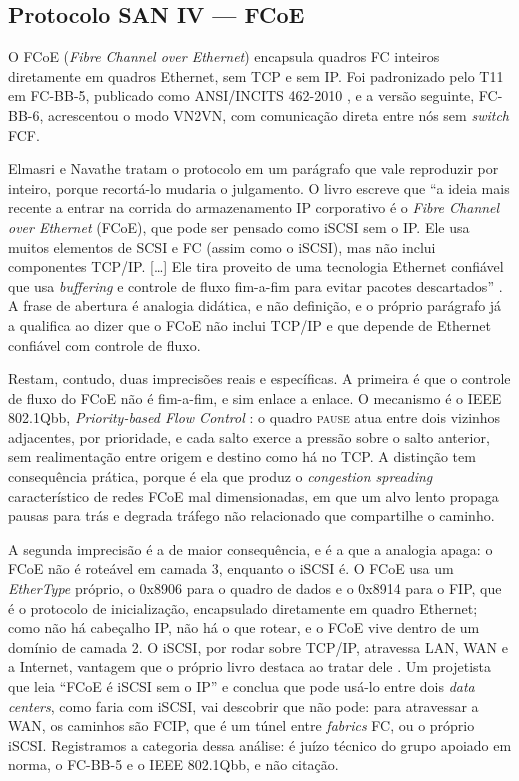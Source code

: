 \documentclass[11pt,a4paper]{article}
\begin{document}
\subsection{Protocolo SAN IV --- FCoE}
\label{sec:fcoe}

O FCoE (\textit{Fibre Channel over Ethernet}) encapsula quadros FC inteiros diretamente em quadros
Ethernet, sem TCP e sem IP. Foi padronizado pelo T11 em FC-BB-5, publicado como ANSI/INCITS 462-2010
\cite{fcbb5}, e a versão seguinte, FC-BB-6, acrescentou o modo VN2VN, com comunicação direta entre
nós sem \textit{switch} FCF.

Elmasri e Navathe tratam o protocolo em um parágrafo que vale reproduzir por inteiro, porque
recortá-lo mudaria o julgamento. O livro escreve que ``a ideia mais recente a entrar na corrida do
armazenamento IP corporativo é o \textit{Fibre Channel over Ethernet} (FCoE), que pode ser pensado
como iSCSI sem o IP. Ele usa muitos elementos de SCSI e FC (assim como o iSCSI), mas não inclui
componentes TCP/IP. [\ldots] Ele tira proveito de uma tecnologia Ethernet confiável que usa
\textit{buffering} e controle de fluxo fim-a-fim para evitar pacotes descartados''
\cite{elmasri2018}. A frase de abertura é analogia didática, e não definição, e o próprio parágrafo
já a qualifica ao dizer que o FCoE não inclui TCP/IP e que depende de Ethernet confiável com controle
de fluxo.

Restam, contudo, duas imprecisões reais e específicas. A primeira é que o controle de fluxo do FCoE
não é fim-a-fim, e sim enlace a enlace. O mecanismo é o IEEE 802.1Qbb, \textit{Priority-based Flow
Control} \cite{ieee8021qbb}: o quadro \textsc{pause} atua entre dois vizinhos adjacentes, por
prioridade, e cada salto exerce a pressão sobre o salto anterior, sem realimentação entre origem e
destino como há no TCP. A distinção tem consequência prática, porque é ela que produz o
\textit{congestion spreading} característico de redes FCoE mal dimensionadas, em que um alvo lento
propaga pausas para trás e degrada tráfego não relacionado que compartilhe o caminho.

A segunda imprecisão é a de maior consequência, e é a que a analogia apaga: o FCoE não é roteável em
camada 3, enquanto o iSCSI é. O FCoE usa um \textit{EtherType} próprio, o 0x8906 para o quadro de
dados e o 0x8914 para o FIP, que é o protocolo de inicialização, encapsulado diretamente em quadro
Ethernet; como não há cabeçalho IP, não há o que rotear, e o FCoE vive dentro de um domínio de
camada 2. O iSCSI, por rodar sobre TCP/IP, atravessa LAN, WAN e a Internet, vantagem que o próprio
livro destaca ao tratar dele \cite{elmasri2018}. Um projetista que leia ``FCoE é iSCSI sem o IP'' e
conclua que pode usá-lo entre dois \textit{data centers}, como faria com iSCSI, vai descobrir que não
pode: para atravessar a WAN, os caminhos são FCIP, que é um túnel entre \textit{fabrics} FC, ou o
próprio iSCSI. Registramos a categoria dessa análise: é juízo técnico do grupo apoiado em norma, o
FC-BB-5 e o IEEE 802.1Qbb, e não citação.
\end{document}
